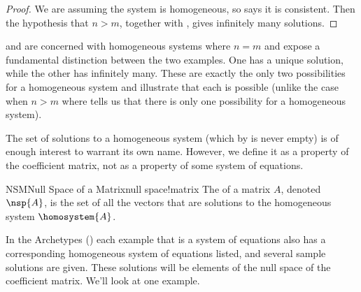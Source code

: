 %
\begin{proof}
We are assuming the system is homogeneous, so  says it is consistent.  Then the hypothesis that $n>m$, together with , gives infinitely many solutions.
\end{proof}
%
 and  are concerned with homogeneous systems where $n=m$ and expose a fundamental distinction between the two examples.  One has a unique solution, while the other has infinitely many.  These are exactly the only two possibilities for a homogeneous system and illustrate that each is possible (unlike the case when $n>m$ where  tells us that there is only one possibility for a homogeneous system).\par
%
%
The set of solutions to a homogeneous system (which by  is never empty) is of enough interest to warrant its own name.  However, we define it as a property of the coefficient matrix, not as a property of some system of equations.
%
\begin{definition}{NSM}{Null Space of a Matrix}{null space!matrix}
The  of a matrix $A$, denoted $\nsp{A}$, is the set of all the vectors that are solutions to the homogeneous system $\homosystem{A}$.
\end{definition}
%
In the Archetypes () each example that is a system of equations also has a corresponding homogeneous system of equations listed, and several sample solutions are given.  These solutions will be elements of the null space of the coefficient matrix.  We'll look at one example.
%
